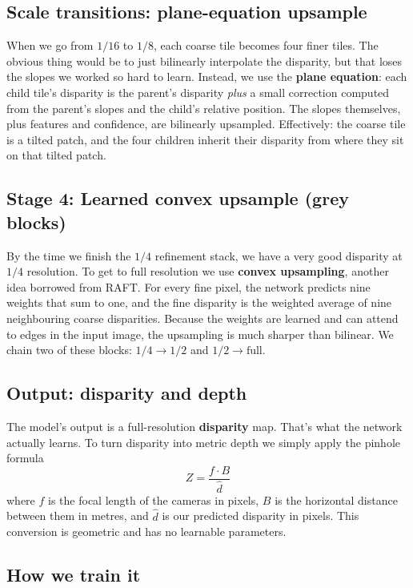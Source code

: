 \documentclass[11pt,a4paper]{article}
\begin{document}
\subsection{Scale transitions: plane-equation upsample}

When we go from $1/16$ to $1/8$, each coarse tile becomes four finer
tiles. The obvious thing would be to just bilinearly interpolate the
disparity, but that loses the slopes we worked so hard to learn.
Instead, we use the \textbf{plane equation}: each child tile's
disparity is the parent's disparity \emph{plus} a small correction
computed from the parent's slopes and the child's relative position.
The slopes themselves, plus features and confidence, are bilinearly
upsampled. Effectively: the coarse tile is a tilted patch, and the four
children inherit their disparity from where they sit on that tilted
patch.

\subsection{Stage 4: Learned convex upsample (grey blocks)}

By the time we finish the $1/4$ refinement stack, we have a very good
disparity at $1/4$ resolution. To get to full resolution we use
\textbf{convex upsampling}, another idea borrowed from RAFT. For every
fine pixel, the network predicts nine weights that sum to one, and the
fine disparity is the weighted average of nine neighbouring coarse
disparities. Because the weights are learned and can attend to edges in
the input image, the upsampling is much sharper than bilinear. We chain
two of these blocks: $1/4 \rightarrow 1/2$ and $1/2 \rightarrow
\text{full}$.

\subsection{Output: disparity and depth}

The model's output is a full-resolution \textbf{disparity} map. That's
what the network actually learns. To turn disparity into metric depth
we simply apply the pinhole formula
\[
  Z = \frac{f \cdot B}{\hat{d}}
\]
where $f$ is the focal length of the cameras in pixels, $B$ is the
horizontal distance between them in metres, and $\hat{d}$ is our
predicted disparity in pixels. This conversion is geometric and has no
learnable parameters.

\subsection{How we train it}
\end{document}

